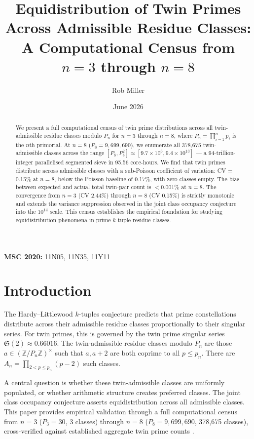 \documentclass[11pt]{article}
\title{Equidistribution of Twin Primes Across Admissible Residue Classes: \\ A Computational Census from $n=3$ through $n=8$}
\author{Rob Miller}
\date{June 2026}
\begin{document}
\maketitle

\begin{abstract}
We present a full computational census of twin prime distributions across all twin-admissible residue classes modulo $P_n$ for $n = 3$ through $n = 8$, where $P_n = \prod_{i=1}^n p_i$ is the $n$th primorial. At $n=8$ ($P_8 = 9{,}699{,}690$), we enumerate all 378{,}675 twin-admissible classes across the range $[P_8, P_8^2] \approx [9.7 \times 10^6, 9.4 \times 10^{13}]$ --- a 94-trillion-integer parallelised segmented sieve in 95.56 core-hours. We find that twin primes distribute across admissible classes with a sub-Poisson coefficient of variation: CV = 0.15\% at $n=8$, below the Poisson baseline of 0.17\%, with zero classes empty. The bias between expected and actual total twin-pair count is $<0.001\%$ at $n=8$. The convergence from $n=3$ (CV 2.44\%) through $n=8$ (CV 0.15\%) is strictly monotonic and extends the variance suppression observed in the joint class occupancy conjecture into the $10^{14}$ scale. This census establishes the empirical foundation for studying equidistribution phenomena in prime $k$-tuple residue classes.
\end{abstract}

\noindent \textbf{MSC 2020:} 11N05, 11N35, 11Y11

\section{Introduction}
\label{sec:intro}

The Hardy--Littlewood $k$-tuples conjecture \cite{HL23} predicts that prime constellations distribute across their admissible residue classes proportionally to their singular series. For twin primes, this is governed by the twin prime singular series $\mathfrak{S}(2) \approx 0.66016$. The twin-admissible residue classes modulo $P_n$ are those $a \in (\mathbb{Z}/P_n\mathbb{Z})^\times$ such that $a, a+2$ are both coprime to all $p \leq p_n$. There are $A_n = \prod_{2 < p \leq p_n} (p-2)$ such classes.

A central question is whether these twin-admissible classes are uniformly populated, or whether arithmetic structure creates preferred classes. The joint class occupancy conjecture asserts equidistribution across all admissible classes. This paper provides empirical validation through a full computational census from $n=3$ ($P_3 = 30$, 3 classes) through $n=8$ ($P_8 = 9{,}699{,}690$, 378{,}675 classes), cross-verified against established aggregate twin prime counts \cite{Nic12}.
\end{document}
